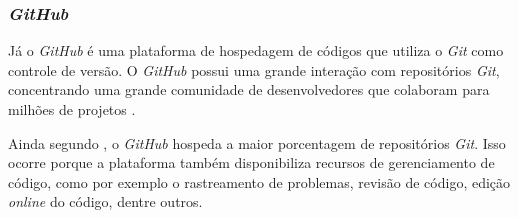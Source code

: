 \subsubsection{\textit{GitHub}}


Já o \textit{GitHub} é uma plataforma de hospedagem de códigos que utiliza o \textit{Git} como controle de versão. O \textit{GitHub} possui uma grande interação com repositórios \textit{Git}, concentrando uma grande comunidade de desenvolvedores que colaboram para milhões de projetos \cite{CHACON2014}.

Ainda segundo , o \textit{GitHub} hospeda a maior porcentagem de repositórios \textit{Git}. Isso ocorre porque a plataforma também disponibiliza recursos de gerenciamento de código, como por exemplo o rastreamento de problemas, revisão de código, edição \textit{online} do código, dentre outros.